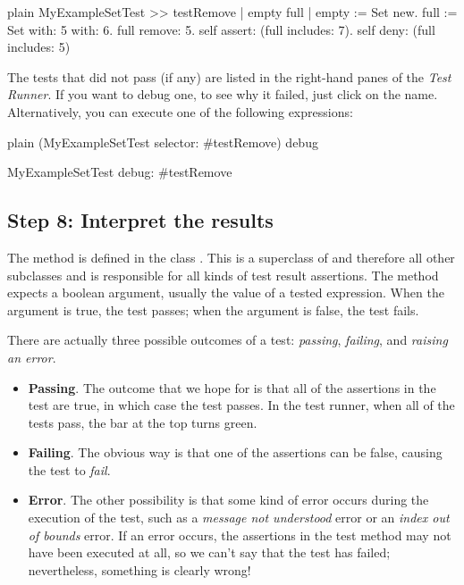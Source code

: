 \documentclass[10pt,twoside,english]{_support/latex/sbabook/sbabook}
\begin{document}
\begin{displaycode}{plain}
MyExampleSetTest >> testRemove
	| empty full |
	empty := Set new.
	full := Set with: 5 with: 6.
	full remove: 5.
	self assert: (full includes: 7).
	self deny: (full includes: 5)
\end{displaycode}

The tests that did not pass (if any) are listed in the right-hand panes of the
\textit{Test Runner}. If you want to debug one, to see why it failed, just click on
the name. Alternatively, you can execute one of the following expressions:

\begin{displaycode}{plain}
(MyExampleSetTest selector: #testRemove) debug

MyExampleSetTest debug: #testRemove
\end{displaycode}
\subsection{Step 8: Interpret the results}
The method  is defined in the class . This is a superclass
of  and therefore all other  subclasses and is responsible for
all kinds of test result assertions.
The  method expects a boolean argument, usually the value of a tested expression. When the
argument is true, the test passes; when the argument is false, the test fails.

There are actually three possible outcomes of a test: \textit{passing}, \textit{failing}, and \textit{raising an error}.

\begin{itemize}
\item \textbf{Passing}. The outcome that we hope for is that all of the assertions in the test are true, in which case the test passes. In the test runner, when all of the tests pass, the bar at the top turns green. 
\item \textbf{Failing}. The obvious way is that one of the assertions can be false, causing the test to \textit{fail}.
\item \textbf{Error}. The other possibility is that some kind of error occurs during the execution of the test, such as a \textit{message not understood} error or an \textit{index out of bounds} error. If an error occurs, the assertions in the test method may not have been executed at all, so we can't say that the test has failed; nevertheless, something is clearly wrong!
\end{itemize}
\end{document}
